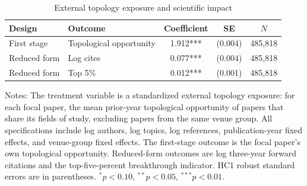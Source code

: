 \begin{table}[!htbp]\centering
\begin{threeparttable}
\caption{External topology exposure and scientific impact}
\label{tab:causal_exposure}
\begin{tabular}{llccc}
\toprule
Design & Outcome & Coefficient & SE & $N$ \\
\midrule
First stage & Topological opportunity & 1.912*** & (0.004) & 485,818 \\
Reduced form & Log cites & 0.077*** & (0.004) & 485,818 \\
Reduced form & Top 5\% & 0.012*** & (0.001) & 485,818 \\
\bottomrule
\end{tabular}
\begin{tablenotes}
\footnotesize
\item Notes: The treatment variable is a standardized external topology exposure: for each focal paper, the mean prior-year topological opportunity of papers that share its fields of study, excluding papers from the same venue group. All specifications include log authors, log topics, log references, publication-year fixed effects, and venue-group fixed effects. The first-stage outcome is the focal paper's own topological opportunity. Reduced-form outcomes are log three-year forward citations and the top-five-percent breakthrough indicator. HC1 robust standard errors are in parentheses. $^{*}p<0.10$, $^{**}p<0.05$, $^{***}p<0.01$.
\end{tablenotes}
\end{threeparttable}
\end{table}

